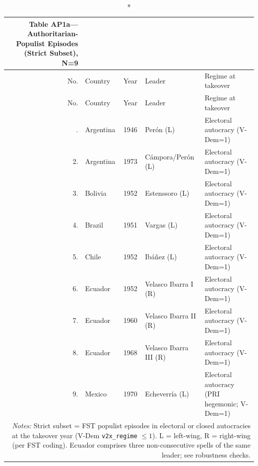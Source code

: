 \def\sym#1{\ifmmode^{#1}\else\(\^{#1}\)\fi}
\setlength{\tabcolsep}{5pt}
{\footnotesize
\begin{longtable}{rp{2.2cm}p{2.4cm}p{3.2cm}p{3.8cm}}
\caption*{\textbf{Table AP1a---Authoritarian-Populist Episodes (Strict Subset), N=9}} \\
\hline\hline
No. & Country & Year & Leader & Regime at takeover \\
\hline
\endfirsthead
\hline\hline
No. & Country & Year & Leader & Regime at takeover \\
\hline
\endhead
\hline
\endfoot
1. & Argentina & 1946 & Per\'on (L) & Electoral autocracy (V-Dem=1) \\
2. & Argentina & 1973 & C\'ampora/Per\'on (L) & Electoral autocracy (V-Dem=1) \\
3. & Bolivia & 1952 & Estenssoro (L) & Electoral autocracy (V-Dem=1) \\
4. & Brazil & 1951 & Vargas (L) & Electoral autocracy (V-Dem=1) \\
5. & Chile & 1952 & Ib\'a\~nez (L) & Electoral autocracy (V-Dem=1) \\
6. & Ecuador & 1952 & Velasco Ibarra I (R) & Electoral autocracy (V-Dem=1) \\
7. & Ecuador & 1960 & Velasco Ibarra II (R) & Electoral autocracy (V-Dem=1) \\
8. & Ecuador & 1968 & Velasco Ibarra III (R) & Electoral autocracy (V-Dem=1) \\
9. & Mexico & 1970 & Echeverr\'ia (L) & Electoral autocracy (PRI hegemonic; V-Dem=1) \\
\hline\hline
\multicolumn{5}{p{14cm}}{\textit{Notes:} Strict subset = FST populist episodes in electoral or closed autocracies at the takeover year (V-Dem \texttt{v2x\_regime} $\leq 1$). L = left-wing, R = right-wing (per FST coding). Ecuador comprises three non-consecutive spells of the same leader; see robustness checks.} \\
\end{longtable}
}
